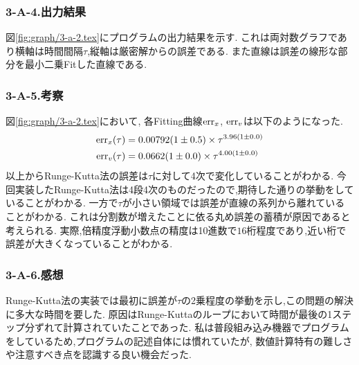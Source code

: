 \subsubsection*{3-A-4.出力結果}
図\ref{fig:graph/3-a-2.tex}にプログラムの出力結果を示す.
これは両対数グラフであり横軸は時間間隔$\tau$,縦軸は厳密解からの誤差である.
また直線は誤差の線形な部分を最小二乗Fitした直線である.
\subsubsection*{3-A-5.考察}
図\ref{fig:graph/3-a-2.tex}において,
各Fitting曲線${\rm err}_x$, ${\rm err}_v$は以下のようになった.
\begin{align}
  {\rm err}_x(\tau)&=0.00792(1\pm0.5)\times \tau^{3.96(1\pm0.0)}\\
  {\rm err}_v(\tau)&=0.0662(1\pm0.0)\times \tau^{4.00(1\pm0.0)}
\end{align}
以上からRunge-Kutta法の誤差は$\tau$に対して4次で変化していることがわかる.
今回実装したRunge-Kutta法は4段4次のものだったので,期待した通りの挙動をしていることがわかる.
一方で$\tau$が小さい領域では誤差が直線の系列から離れていることがわかる.
これは分割数が増えたことに依る丸め誤差の蓄積が原因であると考えられる.
実際,倍精度浮動小数点の精度は10進数で$16$桁程度であり,近い桁で誤差が大きくなっていることがわかる.
\subsubsection*{3-A-6.感想}
Runge-Kutta法の実装では最初に誤差が$\tau$の2乗程度の挙動を示し,この問題の解決に多大な時間を要した.
原因はRunge-Kuttaのループにおいて時間が最後の1ステップ分ずれて計算されていたことであった.
私は普段組み込み機器でプログラムをしているため,プログラムの記述自体には慣れていたが,
数値計算特有の難しさや注意すべき点を認識する良い機会だった.